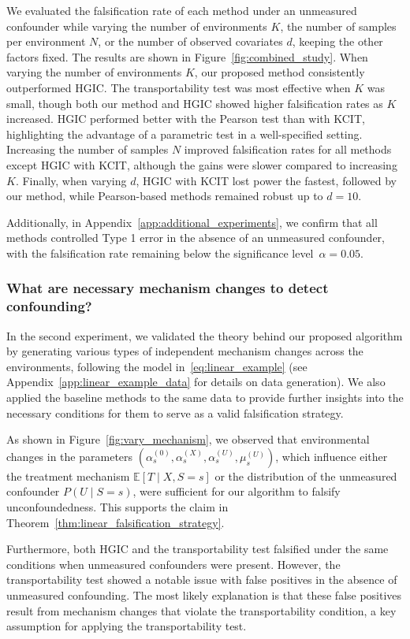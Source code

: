 \documentclass{article}
\begin{document}
We evaluated the falsification rate of each method under an unmeasured confounder while varying the number of environments $K$, the number of samples per environment $N$, or the number of observed covariates $d$, keeping the other factors fixed. The results are shown in Figure~\ref{fig:combined_study}.  When varying the number of environments $K$, our proposed method consistently outperformed HGIC. The transportability test was most effective when $K$ was small, though both our method and HGIC showed higher falsification rates as $K$ increased. HGIC performed better with the Pearson test than with KCIT, highlighting the advantage of a parametric test in a well-specified setting.  Increasing the number of samples $N$ improved falsification rates for all methods except HGIC with KCIT, although the gains were slower compared to increasing $K$. Finally, when varying $d$, HGIC with KCIT lost power the fastest, followed by our method, while Pearson-based methods remained robust up to $d=10$.

Additionally, in Appendix~\ref{app:additional_experiments}, we confirm that all methods controlled Type 1 error in the absence of an unmeasured confounder, with the falsification rate remaining below the significance level~$\alpha=0.05$.

\subsubsection{What are necessary mechanism changes to detect confounding?}
In the second experiment, we validated the theory behind our proposed algorithm by generating various types of independent mechanism changes across the environments, following the model in~\eqref{eq:linear_example} (see Appendix~\ref{app:linear_example_data} for details on data generation). We also applied the baseline methods to the same data to provide further insights into the necessary conditions for them to serve as a valid falsification strategy.

As shown in Figure~\ref{fig:vary_mechanism}, we observed that environmental changes in the parameters $(\alpha_{s}^{(0)}, \alpha_{s}^{(X)}, \alpha_{s}^{(U)}, \mu_{s}^{(U)})$, which influence either the treatment mechanism $\mathbb{E}[T\mid X,S=s]$ or the distribution of the unmeasured confounder $P(U\mid S=s)$, were sufficient for our algorithm to falsify unconfoundedness. This supports the claim in Theorem~\ref{thm:linear_falsification_strategy}.  

Furthermore, both HGIC and the transportability test falsified under the same conditions when unmeasured confounders were present. However, the transportability test showed a notable issue with false positives in the absence of unmeasured confounding. The most likely explanation is that these false positives result from mechanism changes that violate the transportability condition, a key assumption for applying the transportability test.
\end{document}
